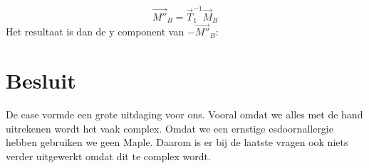 \documentclass[a4paper,10pt]{article}
\begin{document}
\begin{equation}
\vec{M''}_B = \vec{T}_1^{-1}\vec{M}_B
\end{equation}
Het resultaat is dan de y component van $-\vec{M''}_B$: 

\section{Besluit}
De case vormde een grote uitdaging voor ons. Vooral omdat we alles met de hand uitrekenen wordt het vaak complex. Omdat we een ernstige esdoornallergie hebben gebruiken we geen Maple. Daarom is er bij de laatste vragen ook niets verder uitgewerkt omdat dit te complex wordt.
\end{document}
